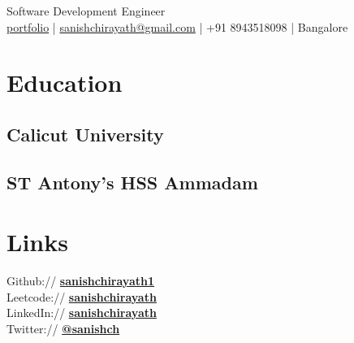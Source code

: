\documentclass[]{deedy-resume-openfont}
\begin{document}
%
%
\lastupdated

%
%
 {Software Development Engineer \\ \href{https://portfolio.hstart.in}{portfolio} |
\href{mailto:sanishchirayath@gmail.com}{sanishchirayath@gmail.com} | +91 8943518098 | Bangalore
}

%
%

\begin{minipage}[t]{0.33\textwidth} 


\section{Education} 

\subsection{Calicut University}
\sectionsep

\subsection{ST Antony's HSS Ammadam}
\sectionsep


\section{Links} 
Github:// \href{https://github.com/sanishchirayath1}{\bf sanishchirayath1} \\
Leetcode:// \href{https://leetcode.com/sanishchirayath}{\bf sanishchirayath} \\
LinkedIn://  \href{https://www.linkedin.com/in/sanishchirayath}{\bf sanishchirayath} \\
Twitter://  \href{https://twitter.com/sanishch}{\bf @sanishch}



\end{minipage}
\end{document}
